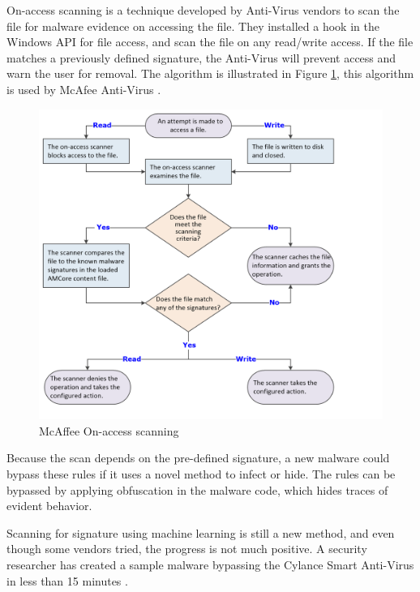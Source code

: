 On-access scanning is a technique developed by Anti-Virus vendors to scan the
file for malware evidence on accessing the file. They installed a hook in the
Windows API for file access, and scan the file on any read/write access. If the
file matches a previously defined signature, the Anti-Virus will prevent access
and warn the user for removal. The algorithm is illustrated in Figure
\ref{fig:onaccessscan}, this algorithm is used by McAfee Anti-Virus
\cite{onaccessscan}.

\begin{figure}[h]
  \centering
  \caption{McAffee On-access scanning}
  \label{fig:onaccessscan}
  \includegraphics[scale=0.8]{images/onaccessscan.png}
\end{figure}

Because the scan depends on the pre-defined signature, a new malware could
bypass these rules if it uses a novel method to infect or hide. The rules can
be bypassed by applying obfuscation in the malware code, which hides traces of
evident behavior.

Scanning for signature using machine learning is still a new method, and even
though some vendors tried, the progress is not much positive. A security
researcher has created a sample malware bypassing the Cylance Smart Anti-Virus
in less than 15 minutes \cite{cylance}.
